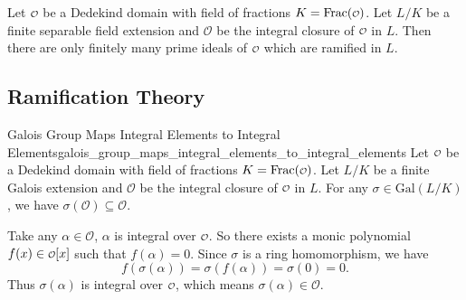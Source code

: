 \begin{proposition}{}{}
    Let $\mathcalo$ be a Dedekind domain with field of fractions $K=\mathrm{Frac}(\mathcalo)$. Let $L/K$ be a finite separable field extension and $\mathcal{O}$ be the integral closure of $\mathcalo$ in $L$. Then there are only finitely many prime
    ideals of $\mathcalo$ which are ramified in $L$.
\end{proposition}

\subsection{Ramification Theory}
\begin{lemma}{Galois Group Maps Integral Elements to Integral Elements}{galois_group_maps_integral_elements_to_integral_elements}
    Let $\mathcalo$ be a Dedekind domain with field of fractions $K=\mathrm{Frac}(\mathcalo)$. Let $L/K$ be a finite Galois extension and $\mathcal{O}$ be the integral closure of $\mathcalo$ in $L$. For any $\sigma\in \mathrm{Gal}(L/K)$, we have $\sigma(\mathcal{O})\subseteq \mathcal{O}$.
\end{lemma}
\begin{prf}
    Take any $\alpha\in \mathcal{O}$, $\alpha$ is integral over $\mathcalo$. So there exists a monic polynomial $f(x)\in \mathcalo[x]$ such that $f(\alpha)=0$. Since $\sigma$ is a ring homomorphism, we have
    \[
        f(\sigma(\alpha))=\sigma(f(\alpha))=\sigma(0)=0.
    \]
    Thus $\sigma(\alpha)$ is integral over $\mathcalo$, which means $\sigma(\alpha)\in \mathcal{O}$.
\end{prf}

